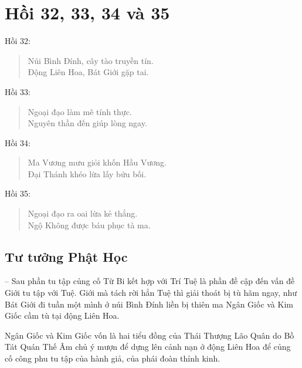 \chapter{Hồi 32, 33, 34 và 35} %
\label{cha:hoi_33_34}

Hồi 32:

\begin{verse}
\begin{itshape}
Núi Bình Đính, cây tào truyền tín.\\
Động Liên Hoa, Bát Giới gặp tai.
\end{itshape}
\end{verse}

Hồi 33:

\begin{verse}
\begin{itshape}
Ngoại đạo làm mê tính thực.\\
Nguyên thần đến giúp lòng ngay.
\end{itshape}
\end{verse}

Hồi 34:

\begin{verse}
\begin{itshape}
Ma Vương mưu giỏi khốn Hầu Vương.\\
Đại Thánh khéo lừa lấy bửu bối.
\end{itshape}
\end{verse}

Hồi 35:

\begin{verse}
\begin{itshape}
Ngoại đạo ra oai lừa kẻ thẳng.\\
Ngộ Không được báu phục tà ma.
\end{itshape}
\end{verse}

\section{Tư tưởng Phật Học} %
\label{sec:33_34_phat_hoc}

-- Sau phần tu tập củng cố Từ Bi kết hợp với Trí Tuệ là phần đề cập đến vấn đề Giới tu tập với Tuệ. Giới mà tách rời hẳn Tuệ thì giải thoát bị tù hãm ngay, như Bát Giới đi tuần một mình ở núi Bình Đính liền bị thiên ma Ngân Giốc và Kim Giốc cầm tù tại động Liên Hoa.

Ngân Giốc và Kim Giốc vốn là hai tiểu đồng của Thái Thượng Lão Quân do Bồ Tát Quán Thế Âm chủ ý mượn để dựng lên cảnh nạn ở động Liên Hoa để củng cố công phu tu tập của hành giả, của phái đoàn thỉnh kinh.

